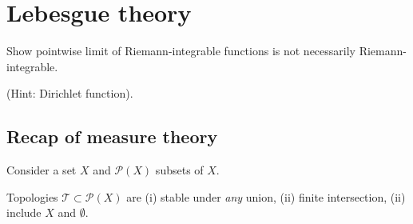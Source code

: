 \documentclass{article}
\newcommand{\powerset}{\mathscr{P}}
\begin{document}
\maketitle
\tableofcontents



\section{Lebesgue theory}
\begin{ex}
    Show pointwise limit of Riemann-integrable functions is not necessarily Riemann-integrable.
\end{ex}
(Hint: Dirichlet function).

\subsection{Recap of measure theory}
Consider a set $X$ and $\powerset(X)$ subsets of $X$.


\begin{remark}
    Topologies $\mathscr{T} \subset \powerset(X)$ are (i) stable under \textit{any} union, (ii) finite intersection, (ii) include $X$ and $\emptyset$.
\end{remark}
\end{document}

